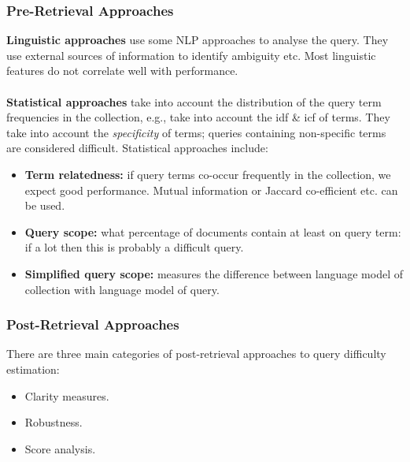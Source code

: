 \documentclass[a4paper,11pt]{article}
\begin{document}
\subsubsection{Pre-Retrieval Approaches}
\textbf{Linguistic approaches} use some NLP approaches to analyse the query.
They use external sources of information to identify ambiguity etc.
Most linguistic features do not correlate well with performance.
\\\\
\textbf{Statistical approaches} take into account the distribution of the query term frequencies in the collection, e.g., take into account the idf \& icf of terms.
They take into account the \textit{specificity} of terms;
queries containing non-specific terms are considered difficult.
Statistical approaches include:
\begin{itemize}
    \item   \textbf{Term relatedness:} if query terms co-occur frequently in the collection, we expect good performance.
            Mutual information or Jaccard co-efficient etc. can be used.
    \item   \textbf{Query scope:} what percentage of documents contain at least on query term: if a lot then this is probably a difficult query.
    \item   \textbf{Simplified query scope:} measures the difference between language model of collection with language model of query.
\end{itemize}

\subsubsection{Post-Retrieval Approaches}
There are three main categories of post-retrieval approaches to query difficulty estimation:
\begin{itemize}
    \item   Clarity measures.
    \item   Robustness.
    \item   Score analysis.
\end{itemize}
\end{document}
